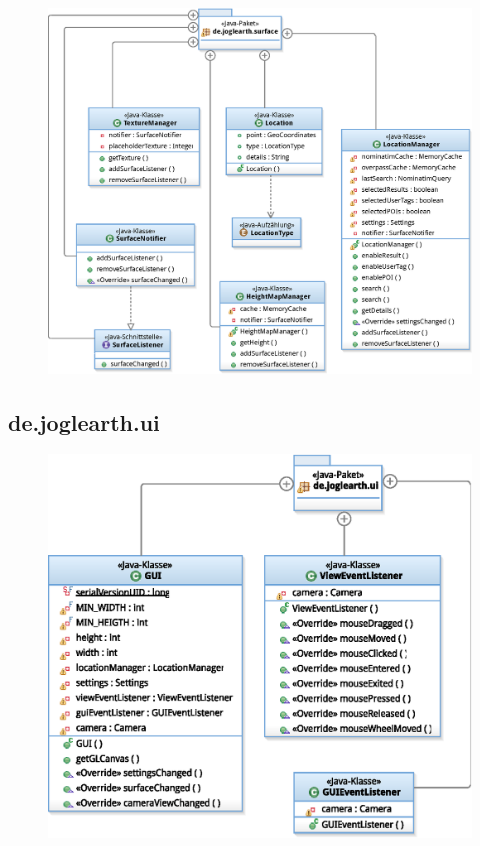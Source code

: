 \documentclass[10pt]{scrreprt}
\begin{document}
\begin{figure}[!htb]
\begin{center}
	\includegraphics[scale=0.55]{de_joglearth_surface.eps}
\end{center}
\end{figure}


\subsection*{de.joglearth.ui}

\begin{figure}[!htb]
\begin{center}
	\includegraphics[scale=0.55]{de_joglearth_ui.eps}
\end{center}
\end{figure}
\end{document}

